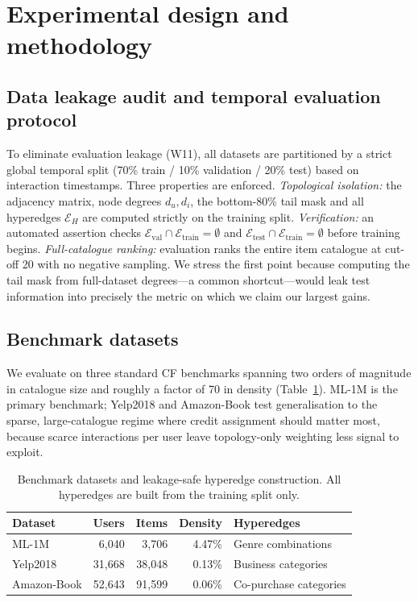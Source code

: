 \documentclass[final,5p,times,twocolumn]{elsarticle}
\begin{document}
\section{Experimental design and methodology}
\label{sec:design}

\subsection{Data leakage audit and temporal evaluation protocol}
\label{sec:leakage}

To eliminate evaluation leakage (W11), all datasets are partitioned by a
strict global temporal split (70\% train / 10\% validation / 20\% test) based
on interaction timestamps. Three properties are enforced. \emph{Topological
isolation:} the adjacency matrix, node degrees $d_u,d_i$, the bottom-80\% tail
mask and all hyperedges $\mathcal{E}_H$ are computed strictly on the training
split. \emph{Verification:} an automated assertion checks
$\mathcal{E}_{\mathrm{val}} \cap \mathcal{E}_{\mathrm{train}} = \emptyset$ and
$\mathcal{E}_{\mathrm{test}} \cap \mathcal{E}_{\mathrm{train}} = \emptyset$
before training begins. \emph{Full-catalogue ranking:} evaluation ranks the
entire item catalogue at cut-off 20 with no negative sampling. We stress the
first point because computing the tail mask from full-dataset degrees---a
common shortcut---would leak test information into precisely the metric on
which we claim our largest gains.

\subsection{Benchmark datasets}
\label{sec:datasets}

We evaluate on three standard CF benchmarks spanning two orders of magnitude
in catalogue size and roughly a factor of 70 in density
(Table~\ref{tab:datasets}). ML-1M is the primary benchmark; Yelp2018 and
Amazon-Book test generalisation to the sparse, large-catalogue regime where
credit assignment should matter most, because scarce interactions per user
leave topology-only weighting less signal to exploit.

\begin{table}[t]
\centering
\caption{Benchmark datasets and leakage-safe hyperedge construction. All
hyperedges are built from the training split only.}
\label{tab:datasets}
\footnotesize
\begin{tabular}{lrrrl}
\toprule
\textbf{Dataset} & \textbf{Users} & \textbf{Items} & \textbf{Density} &
\textbf{Hyperedges} \\
\midrule
ML-1M & 6{,}040 & 3{,}706 & 4.47\% & Genre combinations \\
Yelp2018 & 31{,}668 & 38{,}048 & 0.13\% & Business categories \\
Amazon-Book & 52{,}643 & 91{,}599 & 0.06\% & Co-purchase categories \\
\bottomrule
\end{tabular}
\end{table}
\end{document}
